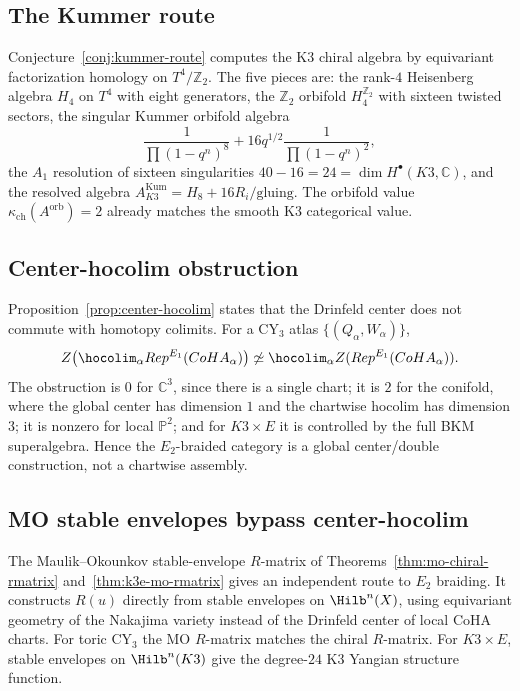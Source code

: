 \documentclass[11pt]{article}
\newcommand{\cZ}{\mathcal{Z}}
\newcommand{\Rep}{\mathrm{Rep}}
\newcommand{\CoHA}{\mathrm{CoHA}}
\newcommand{\C}{\mathbb{C}}
\newcommand{\Z}{\mathbb{Z}}
\theoremstyle{plain}
\theoremstyle{definition}
\theoremstyle{remark}
\begin{document}
\subsection{The Kummer route}

Conjecture~\ref{conj:kummer-route} computes the K3 chiral algebra by
equivariant factorization homology on $T^4/\Z_2$. The five pieces are:
the rank-$4$ Heisenberg algebra $H_4$ on $T^4$ with eight generators,
the $\Z_2$ orbifold $H_4^{\Z_2}$ with sixteen twisted sectors, the
singular Kummer orbifold algebra
\[
 \frac{1}{\prod(1-q^n)^8}+16q^{1/2}\frac{1}{\prod(1-q^n)^2},
\]
the $A_1$ resolution of sixteen singularities
$40-16=24=\dim H^\bullet(K3,\C)$, and the resolved algebra
$A_{K3}^{\mathrm{Kum}}=H_8+16R_i/\mathrm{gluing}$.
The orbifold value $\kappa_{\mathrm{ch}}(A^{\mathrm{orb}})=2$
already matches the smooth K3 categorical value.

\subsection{Center-hocolim obstruction}

Proposition~\ref{prop:center-hocolim} states that the Drinfeld center
does not commute with homotopy colimits. For a CY$_3$ atlas
$\{(Q_\alpha,W_\alpha)\}$,
\[
 \cZ\!\left(\hocolim_\alpha \Rep^{E_1}(\CoHA_\alpha)\right)
 \not\simeq
 \hocolim_\alpha \cZ(\Rep^{E_1}(\CoHA_\alpha)).
\]
The obstruction is $0$ for $\C^3$, since there is a single chart; it is
$2$ for the conifold, where the global center has dimension $1$ and
the chartwise hocolim has dimension $3$; it is nonzero for local
$\mathbb{P}^2$; and for $K3\times E$ it is controlled by the full BKM
superalgebra. Hence the $E_2$-braided category is a global center/double
construction, not a chartwise assembly.

\subsection{MO stable envelopes bypass center-hocolim}

The Maulik--Okounkov stable-envelope $R$-matrix of
Theorems~\ref{thm:mo-chiral-rmatrix} and~\ref{thm:k3e-mo-rmatrix}
gives an independent route to $E_2$ braiding. It constructs $R(u)$
directly from stable envelopes on $\Hilb^n(X)$, using equivariant
geometry of the Nakajima variety instead of the Drinfeld center of
local CoHA charts. For toric CY$_3$ the MO $R$-matrix matches the
chiral $R$-matrix. For $K3\times E$, stable envelopes on
$\Hilb^n(K3)$ give the degree-$24$ K3 Yangian structure function.
\end{document}
